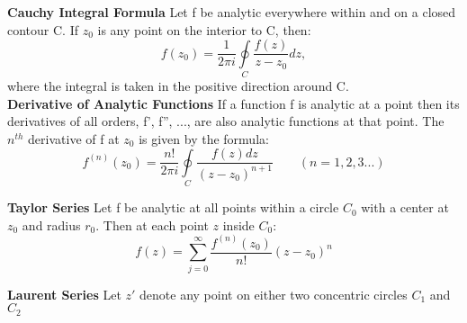 \documentclass[a4paper, 11pt]{article}
\begin{document}
\noindent\textbf{Cauchy Integral Formula} Let f be analytic everywhere within and on a closed contour C. If $z_0$ is any point on the interior to C, then: 
\begin{equation*}
	f(z_0) = \frac{1}{2\pi i}\oint\limits_C \frac{f(z)}{z-z_0}dz, 
\end{equation*}
where the integral is taken in the positive direction around C. \\

\noindent\textbf{Derivative of Analytic Functions} If a function f is analytic at a point then its derivatives of all orders, f', f'', ..., are also analytic functions at that point. The $n^{th}$ derivative of f at $z_0$ is given by the formula: 
\begin{equation*}
	f^{(n)}(z_0) = \frac{n!}{2\pi i}\oint\limits_C \frac{f(z)dz}{(z-z_0)^{n+1}} \quad \quad (n = 1,2,3...)
\end{equation*}

\noindent\textbf{Taylor Series} Let f be analytic at all points within a circle $C_0$ with a center at $z_0$ and radius $r_0$. Then at each point $z$ inside $C_0$: 
\begin{equation*}
	f(z) = \sum\limits_{j=0}^{\infty} \frac{f^{(n)}(z_0)}{n!}(z-z_0)^n
\end{equation*}

\noindent\textbf{Laurent Series} Let $z'$ denote any point on either two concentric circles $C_1$ and $C_2$ 
\end{document}
